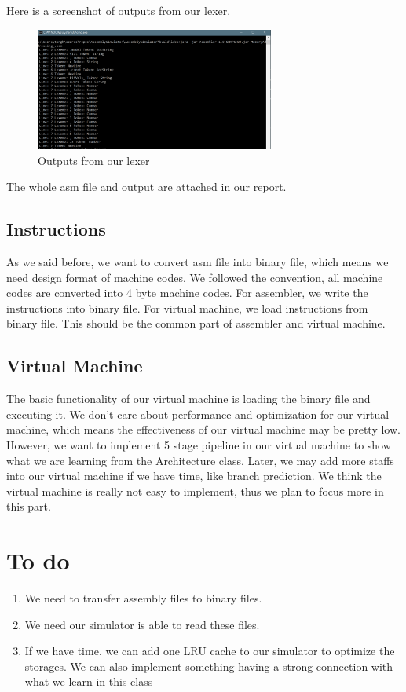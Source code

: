 \documentclass[12pt]{extarticle}
\begin{document}
        Here is a screenshot of outputs from our lexer.
        \begin{figure}[h]
            \centering
            \includegraphics[width=0.7\textwidth]{screenShot.png}
            \caption{Outputs from our lexer}
        \end{figure}
        The whole asm file and output are attached in our report.
        \subsection{Instructions}
        As we said before, we want to convert asm file into binary file, which means we need design format of machine codes. We followed the convention, all machine codes are converted into 4 byte machine codes.
        For assembler, we write the instructions into binary file. For virtual machine, we load instructions from binary file. This should be the common part of assembler and virtual machine. 
        \subsection{Virtual Machine}
        The basic functionality of our virtual machine is loading the binary file and executing it. 
        We don't care about performance and optimization for our virtual machine, which means the effectiveness of our virtual machine may be pretty low. 
        However, we want to implement 5 stage pipeline in our virtual machine to show what we are learning from the Architecture class.
        Later, we may add more staffs into our virtual machine if we have time, like branch prediction. 
        We think the virtual machine is really not easy to implement, thus we plan to focus more in this part. 

        \section{To do}
        \begin{enumerate}
        \item We need to transfer assembly files to binary files.
        \item We need our simulator is able to read these files.
        \item If we have time, we can add one LRU cache to our simulator to optimize the storages. We can also implement something having a strong connection with what we learn in this class
        \end{enumerate}
\end{document}
